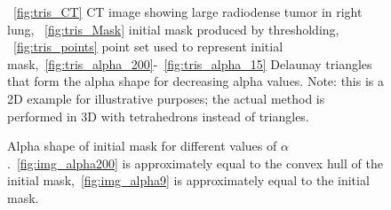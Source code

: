 \documentclass{llncs}
\begin{document}
\begin{figure}[ht!]
{  \label{fig:tris_alpha_66}
  }
  \caption{~\ref{fig:tris_CT} CT image showing large radiodense tumor in right lung, ~\ref{fig:tris_Mask} initial mask produced by thresholding, ~\ref{fig:tris_points} point set used to represent initial mask,~\ref{fig:tris_alpha_200}-~\ref{fig:tris_alpha_15} Delaunay triangles that form the alpha shape for decreasing alpha values. Note: this is a 2D example for illustrative purposes; the actual method is performed in 3D with tetrahedrons instead of triangles. }
  \label{fig:tris}
\end{figure}


\begin{figure}[t]
  \centering
  \caption{Alpha shape of initial mask for different values of $\alpha$.~\ref{fig:img_alpha200} is approximately equal to the convex hull of the initial mask,~\ref{fig:img_alpha9} is approximately equal to the initial mask.}
  \label{fig:alphashapes}
\end{figure}
%
\end{document}
